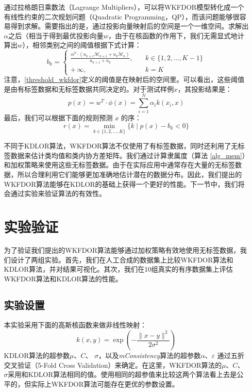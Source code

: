 通过拉格朗日乘数法（Lagrange Multipliers），可以将WKFDOR模型转化成一个有线性约束的二次规划问题（Quadratic Programming，QP），而该问题能够很容易得到求解。需要指出的是，通过投影向量映射后的空间是一个一维空间。求解出\(\alpha\)之后（相当于得到最优投影向量\(w\)，由于在核函数的作用下，我们无需显式地计算出\(w\)），相邻类别之间的阈值根据下式计算：
\begin{equation}
\label{threshold_wkfdor}
b_{k}=\begin{cases}
\frac{\alpha^{T} \cdot (u_{k+1} \mathcal{M}_{k+1} + u_{k} \mathcal{M}_{k})}{u_{k+1}+u_{k}},\quad &k \in \{1,2,\dots,K-1\} \\
+\,\infty,\quad &k=K
\end{cases}
\end{equation}
注意，\autoref{threshold_wkfdor}定义的阈值是在映射后的空间里。可以看出，这些阈值是由有标签数据和无标签数据共同决定的。对于测试样例\(x\)，其投影结果是：
\begin{equation}
\label{projResult_wkfdor}
p(x)=w^{T} \cdot \phi(x)=\sum_{i=1}^{N} \alpha_{i} k(x_{i},x)
\end{equation}
最后，我们可以根据下面的规则预测 \(x\) 的序：
\begin{equation}
\label{rank_rule_wkfdor}
r(x)=\min \limits_{k \in \{1,2,\dots,K\}} \{k\mid p(x)-b_{k}<0\}
\end{equation}

不同于KDLOR算法，WKFDOR算法不仅使用了有标签数据，同时还利用了无标签数据来估计类均值和类内协方差矩阵。我们通过计算隶属度（算法 \ref{alg_mem}）和加权策略来使用这些无标签数据。由于在实际应用中通常存在大量的无标签数据，所以合理利用它们能够更加准确地估计潜在的数据分布。因此，我们提出的WKFDOR算法能够在KDLOR的基础上获得一个更好的性能。下一节中，我们将会通过实验来验证算法的有效性。

\section{实验验证}
为了验证我们提出的WKFDOR算法能够通过加权策略有效地使用无标签数据，我们设计了两组实验。首先，我们在人工合成的数据集上比较WKFDOR算法和KDLOR算法，并对结果可视化。其次，我们在10组真实的有序数据集上评估WKFDOR算法和KDLOR算法的性能。

\subsection{实验设置}
\label{wkfdor_expSet}
本实验采用下面的高斯核函数来做非线性映射：
\begin{equation}
\label{Gaussian_kernel}
k(x,y)=\exp \left ( -\frac{\parallel x-y \parallel^{2}}{2\sigma^{2}} \right )
\end{equation}
KDLOR算法的超参数\(\mu\)、\(C\)、 \(\sigma\)，以及\textit{mConsistency}算法的超参数\(\alpha\)、\(\varepsilon\) 通过五折交叉验证（5-Fold Cross Validation）来确定。在这里，WKFDOR算法的\(\mu\)、\(C\)、 \(\sigma\)采用和KDLOR算法相同的值。使用相同的超参值来比较这两个算法看上去是公平的，但实际上WKFDOR算法可能存在更优的参数设置。

